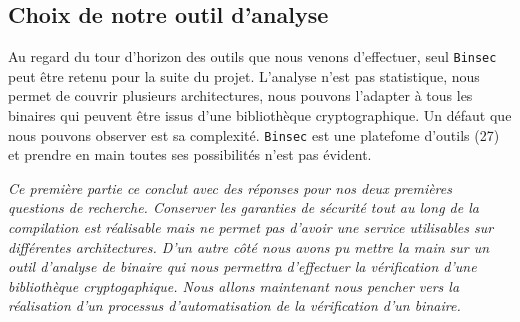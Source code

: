 \subsection*{Choix de notre outil d'analyse}

Au regard du tour d'horizon des outils que nous venons d'effectuer, seul \texttt{Binsec} peut être retenu pour la suite du projet. L'analyse n'est pas statistique, nous permet de couvrir plusieurs architectures, nous pouvons l'adapter à tous les binaires qui peuvent être issus d'une bibliothèque cryptographique. Un défaut que nous pouvons observer est sa complexité. \texttt{Binsec} est une platefome d'outils (27) et prendre en main toutes ses possibilités n'est pas évident.


\vfill
\textit{Ce première partie ce conclut avec des réponses pour nos deux premières questions de recherche. Conserver les garanties de sécurité tout au long de la compilation est réalisable mais ne permet pas d'avoir une service utilisables sur différentes architectures. D'un autre côté nous avons pu mettre la main sur un outil d'analyse de binaire qui nous permettra d'effectuer la vérification d'une bibliothèque cryptogaphique. Nous allons maintenant nous pencher vers la réalisation d'un processus d'automatisation de la vérification d'un binaire.}